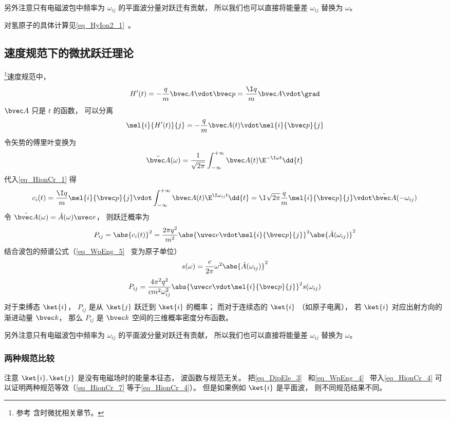 另外注意只有电磁波包中频率为 $\omega_{ij}$ 的平面波分量对跃迁有贡献， 所以我们也可以直接将能量差 $\omega_{ij}$ 替换为 $\omega$。

对氢原子的具体计算见\autoref{eq_HyIon2_1}~。

\subsection{速度规范下的微扰跃迁理论}
\footnote{参考\cite{Merzbacher} 含时微扰相关章节。}速度规范中，
\begin{equation}
H'(t) = -\frac{q}{m}\bvec A \vdot \bvec p = \frac{\I q}{m}\bvec A \vdot \grad
\end{equation}
$\bvec A$ 只是 $t$ 的函数， 可以分离
\begin{equation}
\mel{i}{H'(t)}{j} = -\frac{q}{m}\bvec A(t) \vdot \mel{i}{\bvec p}{j}
\end{equation}
令矢势的傅里叶变换为
\begin{equation}
\tilde {\bvec A}(\omega) = \frac{1}{\sqrt{2\pi}} \int_{-\infty}^{+\infty} \bvec A(t) \E^{-\I\omega t} \dd{t}
\end{equation}
代入\autoref{eq_HionCr_1} 得
\begin{equation}\label{eq_HionCr_4}
c_i(t) = \frac{\I q}{m} \mel{i}{\bvec p}{j} \vdot \int_{-\infty}^{+\infty}  \bvec A(t) \E^{\I\omega_{ij} t} \dd{t} = \I\sqrt{2\pi}\frac{q}{m} \mel{i}{\bvec p}{j} \vdot \tilde {\bvec A}(-\omega_{ij})
\end{equation}
令 $\tilde {\bvec A}(\omega) = \tilde {A}(\omega)\uvec e$， 则跃迁概率为
\begin{equation}\label{eq_HionCr_3}
P_{ij} = \abs{c_i(t)}^2 = \frac{2\pi q^2}{m^2} \abs{\uvec e \vdot\mel{i}{\bvec p}{j}}^2 \abs{\tilde {A}(\omega_{ij})}^2
\end{equation}
结合波包的频谱公式（\autoref{eq_WpEng_5}~ 变为原子单位）
\begin{equation}
s(\omega) = \frac{c}{2\pi} \omega^2 \abs{\tilde {A}(\omega_{ij})}^2
\end{equation}
\begin{equation}\label{eq_HionCr_5}
P_{ij} = \frac{4\pi^2 q^2}{c m^2 \omega_{ij}^2} \abs{\uvec e \vdot\mel{i}{\bvec p}{j}}^2 s(\omega_{ij})
\end{equation}
对于束缚态 $\ket{i}$， $P_{ij}$ 是从 $\ket{j}$ 跃迁到 $\ket{i}$ 的概率； 而对于连续态的 $\ket{i}$ （如原子电离）， 若 $\ket{i}$ 对应出射方向的渐进动量 $\bvec k$， 那么 $P_{ij}$ 是 $\bvec k$ 空间的三维概率密度分布函数。

另外注意只有电磁波包中频率为 $\omega_{ij}$ 的平面波分量对跃迁有贡献， 所以我们也可以直接将能量差 $\omega_{ij}$ 替换为 $\omega$。

\subsubsection{两种规范比较}
注意 $\ket{i}, \ket{j}$ 是没有电磁场时的能量本征态， 波函数与规范无关。 把\autoref{eq_DipEle_3}~ 和\autoref{eq_WpEng_4}~ 带入\autoref{eq_HionCr_4} 可以证明两种规范等效（\autoref{eq_HionCr_7}  等于\autoref{eq_HionCr_4}）。 但是如果例如 $\ket{i}$ 是平面波， 则不同规范结果不同。
